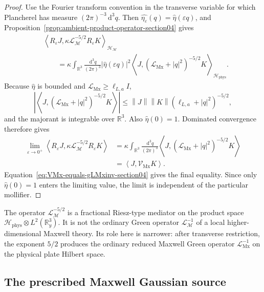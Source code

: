 \documentclass[11pt]{article}
\providecommand{\R}{\mathbb{R}}
\providecommand{\dd}{\,\mathrm{d}}
\providecommand{\eps}{\varepsilon}
\providecommand{\abs}[1]{\left\lvert #1\right\rvert}
\providecommand{\norm}[1]{\left\lVert #1\right\rVert}
\providecommand{\inner}[2]{\left\langle #1,#2\right\rangle}
\providecommand{\Hphys}{\mathcal H_{\mathrm{phys}}}
\providecommand{\LMx}{\mathcal L_{\mathrm{Mx}}}
\providecommand{\Lamb}{\mathcal L_{\mathcal M}}
\providecommand{\VMx}{\mathcal V_{\mathrm{Mx}}}
\numberwithin{equation}{section}
\begin{document}
\begin{proof}
Use the Fourier transform convention in the transverse variable for which
Plancherel has measure \((2\pi)^{-3}\dd^3q\).  Then
\(\widehat{\eta_\eps}(q)=\widehat\eta(\eps q)\), and
Proposition~\ref{prop:ambient-product-operator-section04} gives
\begin{align*}
&\inner{R_\eps J}{\kappa\Lamb^{-5/2}R_\eps K}_{\mathcal H_{\mathcal M}} \\
&\qquad =
\kappa
\int_{\R^3}\frac{\dd^3q}{(2\pi)^3}
\abs{\widehat\eta(\eps q)}^2
\inner{J}{(\LMx+\abs{q}^2)^{-5/2}K}_{\Hphys} .
\end{align*}
Because \(\widehat\eta\) is bounded and \(\LMx\geq\ell_{L,a}I\),
\[
    \abs{\inner{J}{(\LMx+\abs{q}^2)^{-5/2}K}}
    \leq
    \norm{J}\norm{K}(\ell_{L,a}+\abs{q}^2)^{-5/2},
\]
and the majorant is integrable over \(\R^3\).  Also \(\widehat\eta(0)=1\).
Dominated convergence therefore gives
\begin{align*}
    \lim_{\eps\to0^+}
    \inner{R_\eps J}{\kappa\Lamb^{-5/2}R_\eps K}
    &=
    \kappa
    \int_{\R^3}\frac{\dd^3q}{(2\pi)^3}
    \inner{J}{(\LMx+\abs{q}^2)^{-5/2}K} \\
    &=
    \inner{J}{\VMx K}.
\end{align*}
Equation~\eqref{eq:VMx-equals-gLMxinv-section04} gives the final equality.
Since only \(\widehat\eta(0)=1\) enters the limiting value, the limit is
independent of the particular mollifier.
\end{proof}

\begin{remark}
\label{rem:fractional-ambient-mediator-Mx}
The operator \(\Lamb^{-5/2}\) is a fractional Riesz-type mediator on the product
space \(\Hphys\otimes L^2(\R^3_y)\).  It is not the ordinary Green operator
\(\Lamb^{-1}\) of a local higher-dimensional Maxwell theory.  Its role here is
narrower: after transverse restriction, the exponent \(5/2\) produces the
ordinary reduced Maxwell Green operator \(\LMx^{-1}\) on the physical plate
Hilbert space.
\end{remark}

\subsection{The prescribed Maxwell Gaussian source}
\label{subsec:maxwell-gaussian-source}
\end{document}
